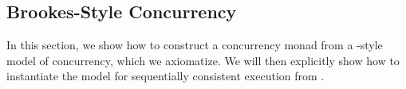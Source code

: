 \documentclass[acmsmall,screen,review]{acmart}
\newcounter{todos}
\newcommand{\TODO}[1]{{
  \stepcounter{todos}
  \begin{center}\large{\textcolor{red}{\textbf{TODO \arabic{todos}:} #1}}\end{center}
}}
\begin{document}







\subsection{Brookes-Style Concurrency}

\label{apx:rel-acq}

In this section, we show how to construct a concurrency monad from a
\citet{brookes-full-abstraction-96}-style model of concurrency, which we axiomatize.
We will then explicitly show how to instantiate the model for sequentially consistent execution
from \citet{brookes-full-abstraction-96}.
\end{document}
